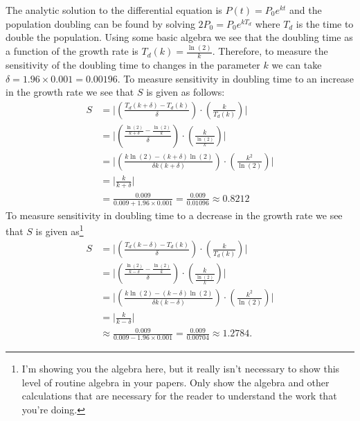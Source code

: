 \documentclass[
]{book}
\theoremstyle{definition}
\theoremstyle{definition}
\theoremstyle{definition}
\theoremstyle{remark}
\begin{document}
The analytic solution to the differential equation is
\(P(t) = P_0 e^{kt}\) and the population doubling can be found by solving
\(2P_0 = P_0 e^{kT_d}\) where \(T_d\) is the time to double the population.
Using some basic algebra we see that the doubling time as a function of
the growth rate is \(T_d(k) = \frac{\ln(2)}{k}\). Therefore, to measure
the sensitivity of the doubling time to changes in the parameter \(k\) we
can take \(\delta = 1.96 \times 0.001 = 0.00196\). To measure sensitivity in doubling time
to an increase in the growth rate we see that \(S\) is given as follows:
\[\begin{aligned}
    S &= \Big| \left( \frac{T_d(k+\delta)-T_d(k)}{\delta} \right) \cdot \left(
    \frac{k}{T_d(k)} \right) \Big| \\
    &= \Big| \left(\frac{\frac{\ln(2)}{k+\delta} -
    \frac{\ln(2)}{k}}{\delta}  \right) \cdot \left( \frac{k}{\frac{\ln(2)}{k}} \right)
    \Big| \\
    & = \Big| \left( \frac{k\ln(2) - (k+\delta)\ln(2) }{\delta k(k+\delta)} \right) \cdot \left(
    \frac{k^2}{\ln(2)} \right) \Big|  \\
    &= \Big| \frac{k}{k+\delta} \Big| \\
    &= \frac{0.009}{0.009 + 1.96 \times 0.001} = \frac{0.009}{0.01096} \approx
    0.8212\end{aligned}\] To measure sensitivity in doubling time to a
decrease in the growth rate we see that \(S\) is given as\footnote{I'm showing you the algebra here, but it really isn't necessary to
  show this level of routine algebra in your papers. Only show the
  algebra and other calculations that are necessary for the reader to
  understand the work that you're doing.}
\[\begin{aligned}
    S &= \Big| \left( \frac{T_d(k-\delta)-T_d(k)}{\delta} \right) \cdot \left(
    \frac{k}{T_d(k)} \right) \Big| \\
    &= \Big| \left(\frac{\frac{\ln(2)}{k-\delta} -
    \frac{\ln(2)}{k}}{\delta}  \right) \cdot \left( \frac{k}{\frac{\ln(2)}{k}} \right)
    \Big| \\
    & = \Big| \left( \frac{k\ln(2) - (k-\delta)\ln(2) }{\delta k(k-\delta)} \right) \cdot \left(
    \frac{k^2}{\ln(2)} \right) \Big|  \\
    &= \Big| \frac{k}{k-\delta} \Big| \\
    &\approx \frac{0.009}{0.009 - 1.96 \times 0.001} = \frac{0.009}{0.00704} \approx
    1.2784.\end{aligned}\]
\end{document}
